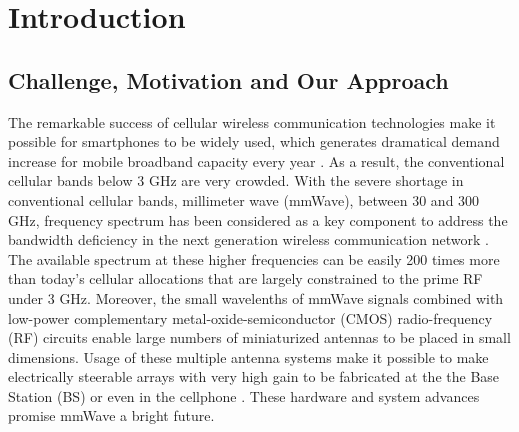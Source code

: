 \chapter{Introduction}\label{ch:Intro}
\section{Challenge, Motivation and Our Approach}
\par The remarkable success of cellular wireless communication technologies make it possible for smartphones to be widely used, which generates dramatical demand increase for mobile broadband capacity every year \cite{index2013global, cerwall2011ericsson, pujol2011mobile}. As a result, the conventional cellular bands below 3 GHz are very crowded. With the severe shortage in conventional cellular bands, millimeter wave (mmWave), between $30$ and $300$ GHz, frequency spectrum has been considered as a key component to address the bandwidth deficiency in the next generation wireless communication network \cite{khan2011mmwave, pi2011introduction, rappaport2011state, pietraski2012millimeter, rangan2014millimeter}. The available spectrum at these higher frequencies can be easily 200 times more than today's cellular allocations that are largely constrained to the prime RF under 3 GHz. Moreover, the small wavelenths of mmWave signals combined with low-power complementary metal-oxide-semiconductor (CMOS) radio-frequency (RF) circuits enable large numbers of miniaturized antennas to be placed in small dimensions. Usage of these multiple antenna systems make it possible to make electrically steerable arrays with very high gain to be fabricated at the the Base Station (BS) or even in the cellphone \cite{doan2004design, zhang2009antenna, gutierrez2009chip, rajagopal2011antenna}. These hardware and system advances promise mmWave a bright future.
